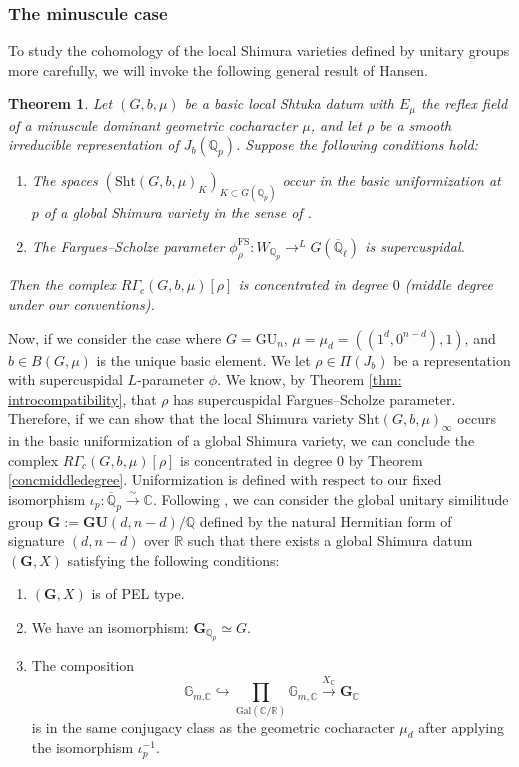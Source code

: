 \documentclass[reqno,11pt]{amsart}
\newtheorem{theorem}{Theorem}[section]
\theoremstyle{remark}
\newcommand{\GU}{\mathrm{GU}}
\newcommand{\R}{\mathbb{R}}
\newcommand{\Gal}{\mathrm{Gal}}
\newcommand{\Sht}{\mathrm{Sht}}
\begin{document}
\subsubsection{The minuscule case}
To study the cohomology of the local Shimura varieties defined by unitary groups more carefully, we will invoke the following general result of Hansen.
\begin{theorem}{\cite[Theorem~1.1.]{Han}}{\label{concmiddledegree}}
Let $(G,b,\mu)$ be a basic local Shtuka datum with $E_{\mu}$ the reflex field of a minuscule dominant geometric cocharacter $\mu$, and let $\rho$ be a smooth irreducible representation of $J_{b}(\mathbb{Q}_{p})$. Suppose the following conditions hold: 
\begin{enumerate}
    \item The spaces $(\Sht(G,b,\mu)_{K})_{K \subset G(\mathbb{Q}_{p})}$ occur in the basic uniformization at $p$ of a global Shimura variety in the sense of \cite[Definition~3.2]{Han}.
    \item The Fargues--Scholze parameter $\phi_{\rho}^{\mathrm{FS}}: W_{\mathbb{Q}_{p}} \rightarrow ^{L}G(\overline{\mathbb{Q}}_{\ell})$ is supercuspidal. 
\end{enumerate}
Then the complex $R\Gamma_{c}(G,b,\mu)[\rho]$ is concentrated in degree $0$ (middle degree under our conventions).
\end{theorem}
Now, if we consider the case where $G = \GU_{n}$, $\mu = \mu_{d} = ((1^{d},0^{n - d}),1)$, and $b \in B(G, \mu)$ is the unique basic element. We let $\rho \in \Pi(J_{b})$ be a representation with supercuspidal $L$-parameter $\phi$. We know, by Theorem \ref{thm: introcompatibility}, that $\rho$ has supercuspidal Fargues--Scholze parameter. Therefore, if we can show that the local Shimura variety $\Sht(G,b,\mu)_{\infty}$ occurs in the basic uniformization of a global Shimura variety, we can conclude the complex $R\Gamma_{c}(G,b,\mu)[\rho]$ is concentrated in degree $0$ by Theorem \ref{concmiddledegree}. Uniformization is defined with respect to our fixed isomorphism $\iota_p: \overline{\mathbb{Q}}_{p} \xrightarrow{\sim} \mathbb{C}$. Following \cite[Section~2.1]{Mo}, we can consider the global unitary similitude group $\mathbf{G} := \mathbf{G}\mathbf{U}(d,n - d)/\mathbb{Q}$ defined by the natural Hermitian form of signature $(d,n - d)$ over $\R$ such that there exists a global Shimura datum  $(\mathbf{G},X)$ satisfying the following conditions:
\begin{enumerate}
    \item $(\mathbf{G},X)$ is of PEL type. 
    \item We have an isomorphism: $\mathbf{G}_{\mathbb{Q}_{p}} \simeq G$.
    \item The composition
    \[ \mathbb{G}_{m.\mathbb{C}} \hookrightarrow \prod_{\Gal(\mathbb{C}/\mathbb{R})} \mathbb{G}_{m,\mathbb{C}} \xrightarrow{X_{\mathbb{C}}} \mathbf{G}_{\mathbb{C}} \]
    is in the same conjugacy class as the geometric cocharacter $\mu_{d}$ after applying the isomorphism $\iota^{-1}_p$.
\end{enumerate}
\end{document}
